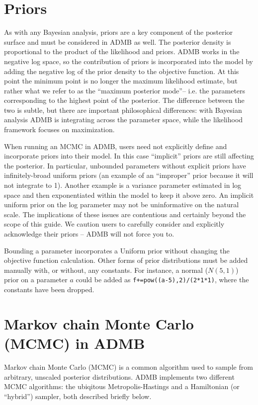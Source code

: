 \documentclass{article}\usepackage[]{graphicx}\usepackage[]{color}
\begin{document}
\section{Priors}
As with any Bayesian analysis, priors are a key component of
the posterior surface and must be considered in ADMB as
well. The posterior density is proportional to the product
of the likelihood and priors. ADMB works in the negative log
space, so the contribution of priors is incorporated into the
model by adding the negative log of the prior density to the
objective function. At this point the minimum point is no
longer the maximum likelihood estimate, but rather what we
refer to as the ``maximum posterior mode''-- i.e. the
parameters corresponding to the highest point of the
posterior. The difference between the two is subtle, but
there are important philosophical differences: with Bayesian
analysis ADMB is integrating across the parameter space,
while the likelihood framework focuses on maximization.

When running an MCMC in ADMB, users need not explicitly define
and incorporate priors into their model. In this case
``implicit'' priors are still affecting the posterior. In
particular, unbounded parameters without explicit priors
have infinitely-broad uniform priors (an example of an
``improper'' prior because it will not integrate to
1). Another example is a variance parameter estimated in log
space and then exponentiated within the model to keep it
above zero. An implicit uniform prior on the log parameter
may not be uninformative on the natural scale. The
implications of these issues are contentious and certainly
beyond the scope of this guide. We caution users to
carefully consider and explicitly acknowledge their priors
-- ADMB will not force you to.

Bounding a parameter incorporates a Uniform prior without 
changing the objective function calculation. Other forms of 
prior distributions must be added manually with,
or without, any constants. For instance, a normal ($N(5,1)$) 
prior on a parameter $a$ could be added as
\texttt{f+=pow((a-5),2)/(2*1*1)}, where the constants have
been dropped.

\section{Markov chain Monte Carlo (MCMC) in ADMB}
Markov chain Monte Carlo (MCMC) is a common algorithm used
to sample from arbitrary, unscaled posterior
distributions. ADMB implements two different MCMC
algorithms: the ubiqitous Metropolis-Hastings and a
Hamiltonian (or ``hybrid'') sampler, both described briefly
below.
\end{document}

